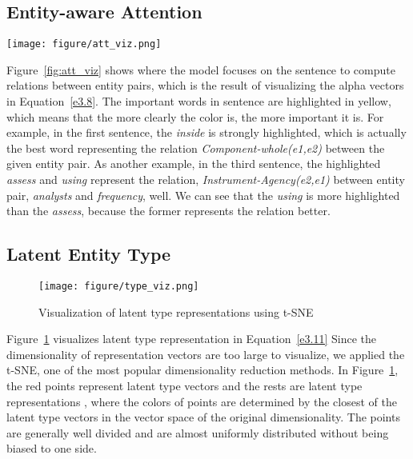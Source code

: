 \documentclass[twoside,leqno,twocolumn]{article}
\begin{document}
\subsection{Entity-aware Attention}
\begin{figure*}[!ht]
\texttt{[image: figure/att\_viz.png]}
\caption{Visualization of Entity-aware Attention}
\label{fig:att_viz}
\end{figure*}
Figure~\ref{fig:att_viz} shows where the model focuses on the sentence to compute relations between entity pairs, which is the result of visualizing the alpha vectors in Equation~\ref{e3.8}.
The important words in sentence are highlighted in yellow, which means that the more clearly the color is, the more important it is.
For example, in the first sentence, the \textit{inside} is strongly highlighted, which is actually the best word representing the relation \textit{Component-whole(e1,e2)} between the given entity pair.
As another example, in the third sentence, the highlighted \textit{assess} and \textit{using} represent the relation, \textit{Instrument-Agency(e2,e1)} between entity pair, \textit{analysts} and \textit{frequency}, well.
We can see that the \textit{using} is more highlighted than the \textit{assess}, because the former represents the relation better.


\subsection{Latent Entity Type}
\begin{figure}[!ht]
\texttt{[image: figure/type\_viz.png]}
\caption{Visualization of latent type representations using t-SNE}
\label{fig:type_viz}
\end{figure}
Figure~\ref{fig:type_viz} visualizes latent type representation  in Equation~\ref{e3.11}
Since the dimensionality of representation vectors are too large to visualize, we applied the t-SNE, one of the most popular dimensionality reduction methods.
In Figure~\ref{fig:type_viz}, the red points represent latent type vectors  and the rests are latent type representations , where the colors of points are determined by the closest of the latent type vectors in the vector space of the original dimensionality.
The points are generally well divided and are almost uniformly distributed without being biased to one side.
\end{document}
